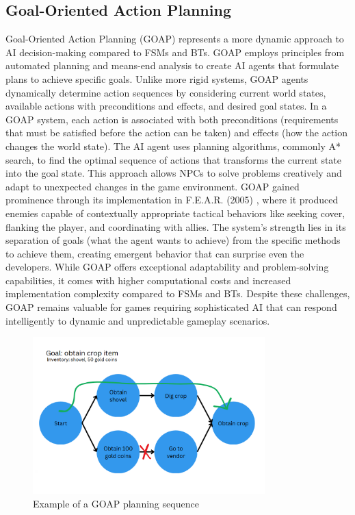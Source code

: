 \subsection{Goal-Oriented Action Planning}

Goal-Oriented Action Planning (GOAP) represents a more dynamic approach to AI decision-making compared to FSMs and BTs. 
GOAP employs principles from automated planning and means-end analysis to create AI agents that formulate plans to achieve specific goals. Unlike more rigid systems, GOAP agents dynamically determine action sequences by considering current world states, available actions with preconditions and effects, and desired goal states.
In a GOAP system, each action is associated with both preconditions (requirements that must be satisfied before the action can be taken) and effects (how the action changes the world state).
The AI agent uses planning algorithms, commonly A* search, to find the optimal sequence of actions that transforms the current state into the goal state. 
This approach allows NPCs to solve problems creatively and adapt to unexpected changes in the game environment.
GOAP gained prominence through its implementation in F.E.A.R. (2005) \cite{thompson2020fear}, where it produced enemies capable of contextually appropriate tactical behaviors like seeking cover, flanking the player, and coordinating with allies. 
The system's strength lies in its separation of goals (what the agent wants to achieve) from the specific methods to achieve them, creating emergent behavior that can surprise even the developers.
While GOAP offers exceptional adaptability and problem-solving capabilities, it comes with higher computational costs and increased implementation complexity compared to FSMs and BTs. Despite these challenges, GOAP remains valuable for games requiring sophisticated AI that can respond intelligently to dynamic and unpredictable gameplay scenarios.

\begin{figure}[h]
    \centering
    \includegraphics[width=0.8\textwidth]{figures/goap.png}
    \caption{Example of a GOAP planning sequence}
    \label{fig:goap}
\end{figure}

